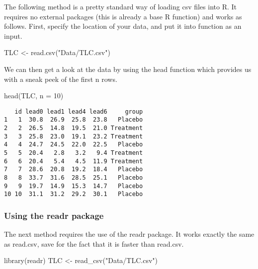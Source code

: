\documentclass[
  letterpaper,
  DIV=11,
  numbers=noendperiod]{scrreprt}
\newenvironment{Shaded}{\begin{snugshade}}{\end{snugshade}}
\newcommand{\AttributeTok}[1]{\textcolor[rgb]{0.40,0.45,0.13}{#1}}
\newcommand{\DecValTok}[1]{\textcolor[rgb]{0.68,0.00,0.00}{#1}}
\newcommand{\FunctionTok}[1]{\textcolor[rgb]{0.28,0.35,0.67}{#1}}
\newcommand{\NormalTok}[1]{\textcolor[rgb]{0.00,0.23,0.31}{#1}}
\newcommand{\OtherTok}[1]{\textcolor[rgb]{0.00,0.23,0.31}{#1}}
\newcommand{\StringTok}[1]{\textcolor[rgb]{0.13,0.47,0.30}{#1}}
\begin{document}
The following method is a pretty standard way of loading csv files into
R. It requires no external packages (this is already a base R function)
and works as follows. First, specify the location of your data, and put
it into function as an input.

\begin{Shaded}
\begin{Highlighting}[]
\NormalTok{TLC }\OtherTok{\textless{}{-}} \FunctionTok{read.csv}\NormalTok{(}\StringTok{"Data/TLC.csv"}\NormalTok{)}
\end{Highlighting}
\end{Shaded}

We can then get a look at the data by using the head function which
provides us with a sneak peek of the first n rows.

\begin{Shaded}
\begin{Highlighting}[]
\FunctionTok{head}\NormalTok{(TLC, }\AttributeTok{n =} \DecValTok{10}\NormalTok{)}
\end{Highlighting}
\end{Shaded}

\begin{verbatim}
   id lead0 lead1 lead4 lead6     group
1   1  30.8  26.9  25.8  23.8   Placebo
2   2  26.5  14.8  19.5  21.0 Treatment
3   3  25.8  23.0  19.1  23.2 Treatment
4   4  24.7  24.5  22.0  22.5   Placebo
5   5  20.4   2.8   3.2   9.4 Treatment
6   6  20.4   5.4   4.5  11.9 Treatment
7   7  28.6  20.8  19.2  18.4   Placebo
8   8  33.7  31.6  28.5  25.1   Placebo
9   9  19.7  14.9  15.3  14.7   Placebo
10 10  31.1  31.2  29.2  30.1   Placebo
\end{verbatim}

\hypertarget{using-the-readr-package}{%
\subsubsection{Using the readr package}\label{using-the-readr-package}}

The next method requires the use of the readr package. It works exactly
the same as read.csv, save for the fact that it is faster than read.csv.

\begin{Shaded}
\begin{Highlighting}[]
\FunctionTok{library}\NormalTok{(readr)}
\NormalTok{TLC }\OtherTok{\textless{}{-}} \FunctionTok{read\_csv}\NormalTok{(}\StringTok{"Data/TLC.csv"}\NormalTok{)}
\end{Highlighting}
\end{Shaded}
\end{document}
